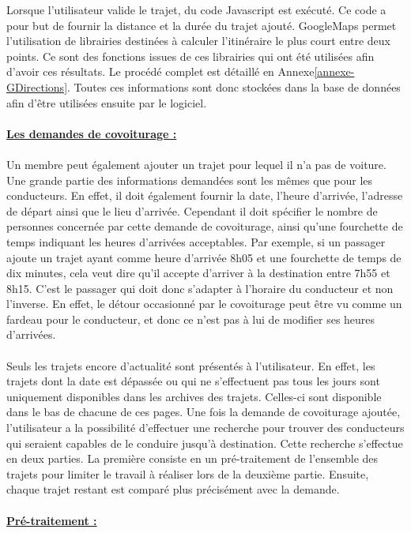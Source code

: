 \documentclass[12pt, a4paper, oneside]{article}
\begin{document}
    Lorsque l'utilisateur valide le trajet, du code Javascript est exécuté. Ce code a pour but de fournir la distance et la durée du trajet ajouté. GoogleMaps permet l'utilisation de librairies destinées à calculer l'itinéraire le plus court entre deux points. Ce sont des fonctions issues de ces librairies qui ont été utilisées afin d'avoir ces résultats. Le procédé complet est détaillé en Annexe\ref{annexe-GDirections}. Toutes ces informations sont donc stockées dans la base de données afin d'être utilisées ensuite par le logiciel.\\\\
    \underline{\textbf{Les demandes de covoiturage :}}\\\\
    \indent Un membre peut également ajouter un trajet pour lequel il n'a pas de voiture. Une grande partie des informations demandées sont les mêmes que pour les conducteurs. En effet, il doit également fournir la date, l'heure d'arrivée, l'adresse de départ ainsi que le lieu d'arrivée. Cependant il doit spécifier le nombre de personnes concernée par cette demande de covoiturage, ainsi qu'une fourchette de temps indiquant les heures d'arrivées acceptables. Par exemple, si un passager ajoute un trajet ayant comme heure d'arrivée 8h05 et une fourchette de temps de dix minutes, cela veut dire qu'il accepte d'arriver à la destination entre 7h55 et 8h15. C'est le passager qui doit donc s'adapter à l'horaire du conducteur et non l'inverse. En effet, le détour occasionné par le covoiturage peut être vu comme un fardeau pour le conducteur, et donc ce n'est pas à lui de modifier ses heures d'arrivées.\\\\
    \indent Seuls les trajets encore d'actualité sont présentés à l'utilisateur. En effet, les trajets dont la date est dépassée ou qui ne s'effectuent pas tous les jours sont uniquement disponibles dans les archives des trajets. Celles-ci sont disponible dans le bas de chacune de ces pages. Une fois la demande de covoiturage ajoutée, l'utilisateur a la possibilité d'effectuer une recherche pour trouver des conducteurs qui seraient capables de le conduire jusqu'à destination. Cette recherche s'effectue en deux parties. La première consiste en un pré-traitement de l'ensemble des trajets pour limiter le travail à réaliser lors de la deuxième partie. Ensuite, chaque trajet restant est comparé plus précisément avec la demande.\\\\
    \underline{\textbf{Pré-traitement :}}\\\\
\end{document}
